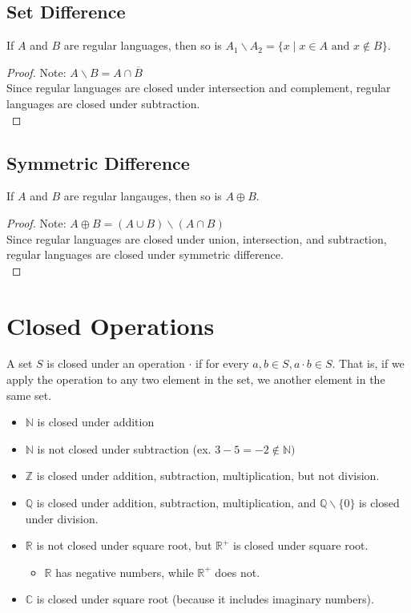\documentclass[11pt,a4paper]{article}
\begin{document}
\subsection{Set Difference}
\begin{theorem}
    If $A$ and $B$ are regular languages, then so is $A_1 \backslash A_2=\{x \mid x\in A\text{ and } x\notin B\}$.

    \begin{proof}
        Note: $A\backslash B=A\cap\overline{B}$ \\

        Since regular languages are closed under intersection and complement, regular languages are closed under subtraction. \\
    \end{proof}
\end{theorem}

\subsection{Symmetric Difference}
\begin{theorem}
    If $A$ and $B$ are regular langauges, then so is $A\oplus B$.

    \begin{proof}
        Note: $A\oplus B=(A\cup B)\backslash(A\cap B)$ \\

        Since regular languages are closed under union, intersection, and subtraction, regular languages are closed under symmetric difference. \\
    \end{proof}
\end{theorem}

\section{Closed Operations}
A set $S$ is closed under an operation $\cdot$ if for every $a,b\in S,a\cdot b\in S$.
That is, if we apply the operation to any two element in the set, we another element in the same set.

\begin{itemize}
    \item $\mathbb{N}$ is closed under addition
    \item $\mathbb{N}$ is not closed under subtraction (ex. $3-5=-2\notin\mathbb{N})$
    \item $\mathbb{Z}$ is closed under addition, subtraction, multiplication, but not division.
    \item $\mathbb{Q}$ is closed under addition, subtraction, multiplication, and $\mathbb{Q} \backslash \{0\}$ is closed under division.
    \item $\mathbb{R}$ is not closed under square root, but $\mathbb{R^+}$ is closed under square root.
    \begin{itemize}
        \item $\mathbb{R}$ has negative numbers, while $\mathbb{R^+}$ does not.
    \end{itemize}
    \item $\mathbb{C}$ is closed under square root (because it includes imaginary numbers).
\end{itemize}
\end{document}
